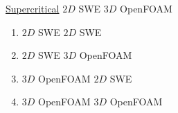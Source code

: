 \begin{frame}
\begin{minipage}{0.5\textwidth}
\centering
\Large \underline{Supercritical} $2D$ SWE    $3D$ OpenFOAM 
\end{minipage}
\hspace{5cm}
\begin{minipage}{0.21\textwidth}
{\scriptsize
\begin{tcolorbox}[colframe=black, colback=white] 
\setlength{\leftmargini}{0pt}
\begin{enumerate}
\item[] {\color{black!50}$2D$ SWE    $2D$ SWE}
\item[] $2D$ SWE    $3D$ OpenFOAM  
\item[] {\color{black!50}$3D$ OpenFOAM     $2D$ SWE}
\item[] {\color{black!50}$3D$ OpenFOAM     $3D$ OpenFOAM}
\end{enumerate}
\end{tcolorbox}}
\end{minipage}


\end{frame}
